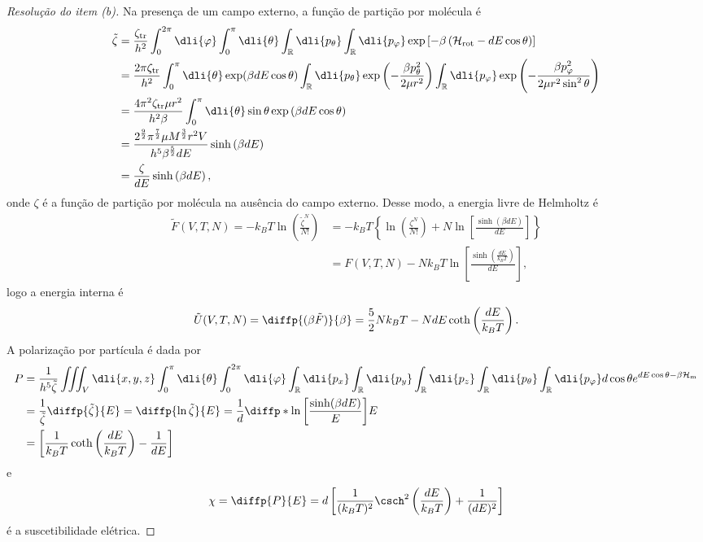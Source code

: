 \begin{proof}[Resolução do item (b)]
    Na presença de um campo externo, a função de partição por molécula é
    \begin{align*}
        \tilde{\zeta} &= \frac{\zeta_{\mathrm{tr}}}{h^2}\int_0^{2\pi} \dli{\varphi} \int_0^\pi \dli{\theta} \int_{\mathbb{R}}\dli{p_\theta} \int_{\mathbb{R}}\dli{p_{\varphi}} \exp\left[-\beta\left(\mathcal{H}_{\mathrm{rot}}-d E \cos\theta\right)\right]\\
              &= \frac{2\pi\zeta_{\mathrm{tr}}}{h^2} \int_0^\pi \dli{\theta} \exp(\beta d E \cos\theta) \int_{\mathbb{R}}\dli{p_\theta} \exp\left(-\frac{\beta p_\theta^2}{2\mu r^2}\right) \int_{\mathbb{R}}\dli{p_{\varphi}}\exp\left(-\frac{\beta p_{\varphi}^2}{2\mu r^2 \sin^2\theta}\right)\\
              &= \frac{4\pi^2 \zeta_{\mathrm{tr}} \mu r^2}{h^2 \beta} \int_0^\pi \dli{\theta} \sin\theta \exp\left(\beta d E \cos\theta\right)\\
              &= \frac{2^{\frac92}\pi^{\frac72} \mu M^{\frac32}r^2V}{h^5 \beta^{\frac52} d E} \sinh\left(\beta d E\right)\\
              &= \frac{\zeta}{dE} \sinh\left(\beta dE\right),
    \end{align*}
    onde \(\zeta\) é a função de partição por molécula na ausência do campo externo. Desse modo, a energia livre de Helmholtz é
    \begin{align*}
        \tilde{F}(V, T, N) = -k_BT \ln \left(\frac{\tilde{\zeta}^N}{N!}\right)
        &= -k_B T \left\{\ln\left(\frac{\zeta^N}{N!}\right) + N\ln\left[\frac{\sinh\left(\beta d E\right)}{d E}\right]\right\}\\
        &= F(V, T, N) - N k_B T\ln\left[\frac{\sinh\left(\frac{d E}{k_BT}\right)}{d E}\right],
    \end{align*}
    logo a energia interna é
    \begin{equation*}
        \tilde{U}(V, T, N) = \diffp{(\beta \tilde{F})}{\beta} = \frac52 N k_B T - N d E\coth\left(\frac{dE}{k_BT}\right).
    \end{equation*}
    A polarização por partícula é dada por
    \begin{align*}
        P &= \frac{1}{h^5 \tilde{\zeta}} \iiint_V \dli{x,y,z} \int_0^\pi \dli{\theta}\int_0^{2\pi} \dli{\varphi} \int_{\mathbb{R}} \dli{p_x} \int_{\mathbb{R}} \dli{p_y} \int_{\mathbb{R}} \dli{p_z} \int_{\mathbb{R}} \dli{p_\theta} \int_{\mathbb{R}} \dli{p_{\varphi}} d \cos\theta e^{dE\cos\theta-\beta \mathcal{H}_{\mathrm{m}}}\\
          &= \frac{1}{\tilde{\zeta}} \diffp{\tilde{\zeta}}{E} = \diffp{\ln \tilde{\zeta}}{E} = \frac{1}{d} \diffp*{\ln\left[\frac{\sinh( \beta d E)}{E}\right]}{E}\\
          &= \left[\frac{1}{k_B T} \coth\left(\frac{d E}{k_B T}\right) - \frac{1}{d E}\right]
    \end{align*}
    e
    \begin{equation*}
        \chi = \diffp{P}{E} = d\left[\frac{1}{(k_BT)^2}\csch^2\left(\frac{dE}{k_BT}\right) + \frac{1}{(dE)^2}\right]
    \end{equation*}
    é a suscetibilidade elétrica.
\end{proof}

